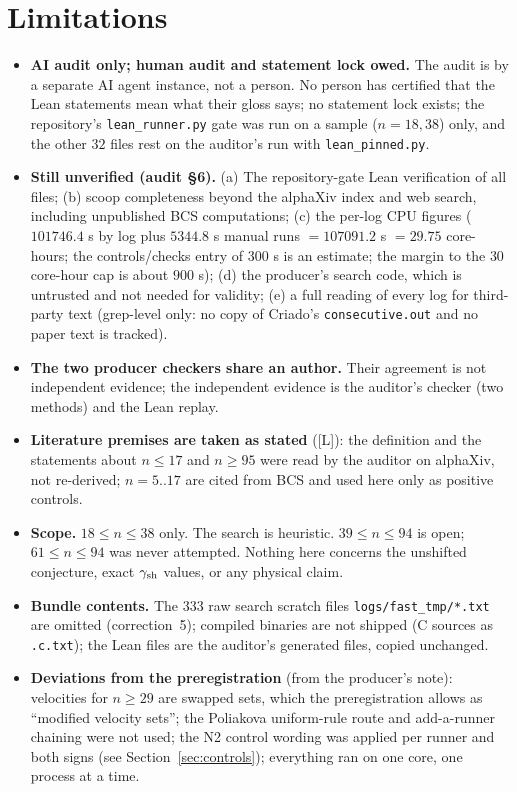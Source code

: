 \documentclass[10pt]{article}
\newcommand{\tier}[1]{\textsf{[#1]}}
\newcommand{\tL}{\tier{L}}
\begin{document}
\section{Limitations}\label{sec:lim}
\begin{itemize}\itemsep=1pt
\item \textbf{AI audit only; human audit and statement lock owed.} The audit is by a separate AI agent instance, not a person. No person has certified that the Lean statements mean what their gloss says; no statement lock exists; the repository's \texttt{lean\_runner.py} gate was run on a sample ($n=18,38$) only, and the other $32$ files rest on the auditor's run with \texttt{lean\_pinned.py}.
\item \textbf{Still unverified (audit \S6).} (a) The repository-gate Lean verification of all files; (b) scoop completeness beyond the alphaXiv index and web search, including unpublished BCS computations; (c) the per-log CPU figures ($101746.4$ s by log plus $5344.8$ s manual runs $=107091.2$ s $=29.75$ core-hours; the controls/checks entry of $300$ s is an estimate; the margin to the $30$ core-hour cap is about $900$ s); (d) the producer's search code, which is untrusted and not needed for validity; (e) a full reading of every log for third-party text (grep-level only: no copy of Criado's \texttt{consecutive.out} and no paper text is tracked).
\item \textbf{The two producer checkers share an author.} Their agreement is not independent evidence; the independent evidence is the auditor's checker (two methods) and the Lean replay.
\item \textbf{Literature premises are taken as stated} (\tL{}): the definition and the statements about $n\le17$ and $n\ge95$ were read by the auditor on alphaXiv, not re-derived; $n=5..17$ are cited from BCS and used here only as positive controls.
\item \textbf{Scope.} $18\le n\le38$ only. The search is heuristic. $39\le n\le94$ is open; $61\le n\le94$ was never attempted. Nothing here concerns the unshifted conjecture, exact $\gamma_{\rm sh}$ values, or any physical claim.
\item \textbf{Bundle contents.} The $333$ raw search scratch files \texttt{logs/fast\_tmp/*.txt} are omitted (correction~5); compiled binaries are not shipped (C sources as \texttt{.c.txt}); the Lean files are the auditor's generated files, copied unchanged.
\item \textbf{Deviations from the preregistration} (from the producer's note): velocities for $n\ge29$ are swapped sets, which the preregistration allows as ``modified velocity sets''; the Poliakova uniform-rule route and add-a-runner chaining were not used; the N2 control wording was applied per runner and both signs (see Section~\ref{sec:controls}); everything ran on one core, one process at a time.
\end{itemize}
\end{document}
